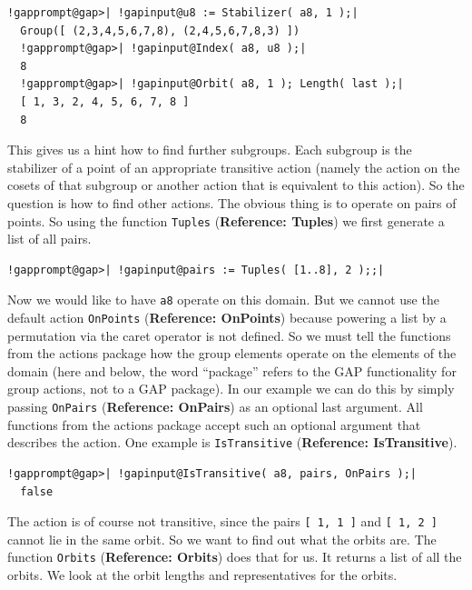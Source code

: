 \documentclass[a4paper,11pt]{report}
\begin{document}
{{ 
\begin{Verbatim}[commandchars=!@|,fontsize=\small,frame=single,label=Example]
  !gapprompt@gap>| !gapinput@u8 := Stabilizer( a8, 1 );|
  Group([ (2,3,4,5,6,7,8), (2,4,5,6,7,8,3) ])
  !gapprompt@gap>| !gapinput@Index( a8, u8 );|
  8
  !gapprompt@gap>| !gapinput@Orbit( a8, 1 ); Length( last );|
  [ 1, 3, 2, 4, 5, 6, 7, 8 ]
  8
\end{Verbatim}
 

 This gives us a hint how to find further subgroups. Each subgroup is the
stabilizer of a point of an appropriate transitive action (namely the action
on the cosets of that subgroup or another action that is equivalent to this
action). So the question is how to find other actions. The obvious thing is to
operate on pairs of points. So using the function \texttt{Tuples} (\textbf{Reference: Tuples}) we first generate a list of all pairs. 

 
\begin{Verbatim}[commandchars=!@|,fontsize=\small,frame=single,label=Example]
  !gapprompt@gap>| !gapinput@pairs := Tuples( [1..8], 2 );;|
\end{Verbatim}
 

 Now we would like to have \texttt{a8} operate on this domain. But we cannot use the default action \texttt{OnPoints} (\textbf{Reference: OnPoints}) because powering a list by a permutation via the caret operator \texttt{\texttt{}} is not defined. So we must tell the functions from the actions package how the
group elements operate on the elements of the domain (here and below, the word ``package'' refers to the \textsf{GAP} functionality for group actions, not to a \textsf{GAP} package). In our example we can do this by simply passing \texttt{OnPairs} (\textbf{Reference: OnPairs}) as an optional last argument. All functions from the actions package accept
such an optional argument that describes the action. One example is \texttt{IsTransitive} (\textbf{Reference: IsTransitive}). 

 
\begin{Verbatim}[commandchars=!@|,fontsize=\small,frame=single,label=Example]
  !gapprompt@gap>| !gapinput@IsTransitive( a8, pairs, OnPairs );|
  false
\end{Verbatim}
 

 The action is of course not transitive, since the pairs \texttt{[ 1, 1 ]} and \texttt{[ 1, 2 ]} cannot lie in the same orbit. So we want to find out what the orbits are. The
function \texttt{Orbits} (\textbf{Reference: Orbits}) does that for us. It returns a list of all the orbits. We look at the orbit
lengths and representatives for the orbits. 

}}
\end{document}
